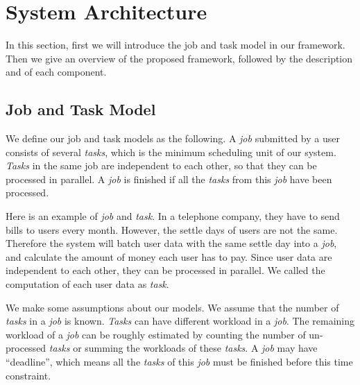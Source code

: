 \section{System Architecture}\label{sec:arch}

In this section, first we will introduce the job and task model in our
framework.
Then we give an overview of the proposed framework, followed by the
description and of each component.


\subsection{Job and Task Model}	%

We define our job and task models as the following.
A {\em job} submitted by a user consists of several {\em tasks}, which
is the minimum scheduling unit of our system.
{\em Tasks} in the same job are independent to each other, so that they
can be processed in parallel.
A {\em job} is finished if all the {\em tasks} from this {\em job} have
been processed.

Here is an example of {\em job} and {\em task}.
In a telephone company, they have to send bills to users every month.
However, the settle days of users are not the same.
Therefore the system will batch user data with the same settle day into
a {\em job}, and calculate the amount of money each user has to pay.
Since user data are independent to each other, they can be processed in
parallel.
We called the computation of each user data as {\em task}.

We make some assumptions about our models.
We assume that the number of {\em tasks} in a {\em job} is known.
{\em Tasks} can have different workload in a {\em job}.
The remaining workload of a {\em job} can be roughly estimated by
counting the number of un-processed {\em tasks} or summing the workloads
of these {\em tasks}.
A {\em job} may have ``deadline'', which means all the {\em tasks} of
this {\em job} must be finished before this time constraint.




